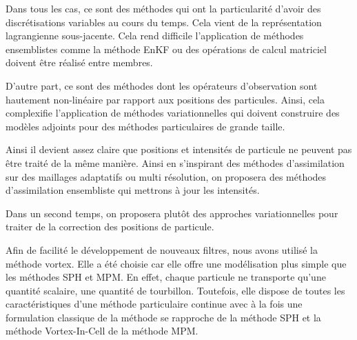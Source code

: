Dans tous les cas, ce sont des méthodes qui ont la particularité d'avoir des discrétisations variables au cours du temps. Cela vient de la représentation lagrangienne sous-jacente. Cela rend difficile l'application de méthodes ensemblistes comme la méthode EnKF ou des opérations de calcul matriciel doivent être réalisé entre membres.

D'autre part, ce sont des méthodes dont les opérateurs d'observation sont hautement non-linéaire par rapport aux positions des particules. Ainsi, cela complexifie l'application de méthodes variationnelles qui doivent construire des modèles adjoints pour des méthodes particulaires de grande taille.

Ainsi il devient assez claire que positions et intensités de particule ne peuvent pas être traité de la même manière. Ainsi en s'inspirant des méthodes d'assimilation sur des maillages adaptatifs ou multi résolution, on proposera des méthodes d'assimilation ensembliste qui mettrons à jour les intensités.

Dans un second temps, on proposera plutôt des approches variationnelles pour traiter de la correction des positions de particule.

Afin de facilité le développement de nouveaux filtres, nous avons utilisé la méthode vortex. Elle a été choisie car elle offre une modélisation plus simple que les méthodes SPH et MPM. En effet, chaque particule ne transporte qu'une quantité scalaire, une quantité de tourbillon. Toutefois, elle dispose de toutes les caractéristiques d'une méthode particulaire continue avec à la fois une formulation classique de la méthode se rapproche de la méthode SPH et la méthode Vortex-In-Cell de la méthode MPM.
